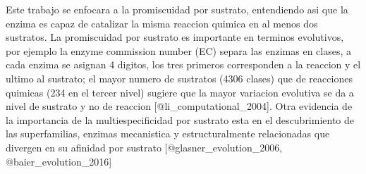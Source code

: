 \documentclass[]{article}
\begin{document}
Este trabajo se enfocara a la promiscuidad por sustrato, entendiendo asi
que la enzima es capaz de catalizar la misma reaccion quimica en al
menos dos sustratos. La promiscuidad por sustrato es importante en
terminos evolutivos, por ejemplo la enzyme commission number (EC) separa
las enzimas en clases, a cada enzima se asignan 4 digitos, los tres
primeros corresponden a la reaccion y el ultimo al sustrato; el mayor
numero de sustratos (4306 clases) que de reacciones quimicas (234 en el
tercer nivel) sugiere que la mayor variacion evolutiva se da a nivel de
sustrato y no de reaccion {[}@li\_computational\_2004{]}. Otra evidencia
de la importancia de la multiespecificidad por sustrato esta en el
descubrimiento de las superfamilias, enzimas mecanistica y
estructuralmente relacionadas que divergen en su afinidad por sustrato
{[}@glasner\_evolution\_2006, @baier\_evolution\_2016{]}
\end{document}
